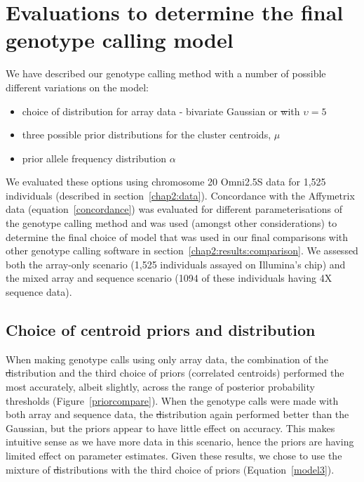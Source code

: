 \setcounter{table}{0}
\setcounter{figure}{0}
\renewcommand{\thefigure}{S\arabic{figure}}
\renewcommand{\thetable}{S\arabic{table}}

\appendix

\chapter{Evaluations to determine the final genotype calling model}\label{chiamantesup}
We have described our genotype calling method with a number of possible different variations on the model:
\begin{itemize}
  \item choice of distribution for array data - bivariate Gaussian or \st with $\upsilon=5$
  \item three possible prior distributions for the cluster centroids, $\mu$
  \item prior allele frequency distribution $\alpha$    
\end{itemize}
We evaluated these options using chromosome 20 Omni2.5S data for 1,525 individuals (described in section~\ref{chap2:data}).  Concordance with the Affymetrix data (equation~\ref{concordance}) was evaluated for different parameterisations of the genotype calling method and was used (amongst other considerations) to determine the final choice of model that was used in our final comparisons with other genotype calling software in section~\ref{chap2:results:comparison}.  We assessed both the array-only scenario (1,525 individuals assayed on Illumina's chip) and the mixed array and sequence scenario (1094 of these individuals having 4X sequence data).

\section*{Choice of centroid priors and distribution} \label{centroidcompare}
\label{chap2:results:centroid}
When making genotype calls using only array data, the combination of the \st distribution and the third choice of priors (correlated centroids) performed the most accurately, albeit slightly, across the range of posterior probability thresholds (Figure~\ref{priorcompare}).  When the genotype calls were made with both array and sequence data, the \st distribution again performed better than the Gaussian, but the priors appear to have little effect on accuracy.  This makes intuitive sense as we have more data in this scenario, hence the priors are having limited effect on parameter estimates.  Given these results, we chose to use the mixture of \st distributions with the third choice of priors (Equation~\ref{model3}).

